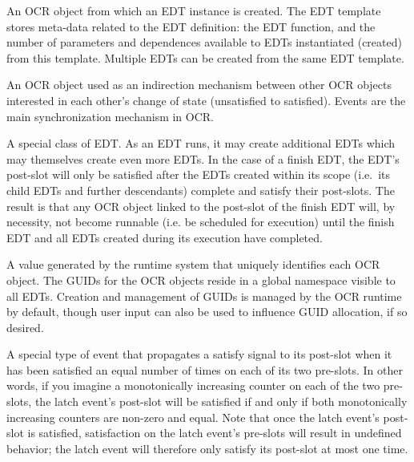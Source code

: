 \glossarydefend
{}
\glossarydefstart
An OCR object from which an EDT instance is created. The EDT template
stores meta-data related to the EDT definition: the EDT function, and
the number of parameters and dependences available to EDTs
instantiated (created) from this template. Multiple EDTs can be created from the
same EDT template.
\glossarydefend

\glossarydefstart
An OCR object used as an indirection mechanism between other OCR
objects interested in each other's change of state (unsatisfied to
satisfied). Events are the main synchronization mechanism in OCR.
\glossarydefend

\glossarydefstart
A special class of EDT. As an EDT runs, it may create additional EDTs
which may themselves create even more EDTs.
In the case of a finish EDT, the EDT's post-slot will only be
satisfied after the EDTs created within its scope (i.e.\ its child EDTs and further
descendants) complete and satisfy their post-slots. The result is that
any OCR object linked to the post-slot of the finish EDT will, by
necessity, not become runnable (i.e. be scheduled for
execution) until the finish EDT and all EDTs created during its
execution have completed.
\glossarydefend

\glossarydefstart
A value generated by the runtime system that uniquely identifies each
OCR object. The GUIDs for the OCR objects reside in a global namespace
visible to all EDTs. Creation and management
of GUIDs is managed by the OCR runtime by default, though user input can also be
used to influence GUID allocation, if so desired.
\glossarydefend

\glossarydefstart
A special type of event that propagates a satisfy signal to its post-slot
when it has been satisfied an equal number of times on each of its two
pre-slots. In other words, if you imagine a monotonically increasing
counter on each of the two pre-slots, the latch event's post-slot will
be satisfied if and only if both monotonically
increasing counters are non-zero and equal. Note that once the latch
event's post-slot is satisfied, satisfaction on the latch event's
pre-slots will result in undefined behavior; the latch event will
therefore only satisfy its post-slot at most one time.
\glossarydefend


